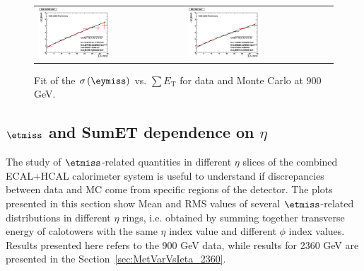 \begin{figure}[h!]
 \centering
 \begin{tabular}{ll}
  \includegraphics[width=0.5\textwidth]{plots_DataVsMC_MB_900GeV/final_metysigma_sumet_DATA_900.eps} &
  \includegraphics[width=0.5\textwidth]{plots_DataVsMC_MB_900GeV/final_metysigma_sumet_MC_900.eps} \\
 \end{tabular}
 \caption{\small Fit of the $\sigma\left(\eymiss\right)$ vs. $\sum E_\text{T}$ for data and Monte Carlo at $900$ GeV.\label{fig:MEySigma_vs_SumET_900_fit}}
\end{figure}


\clearpage

\subsection{$\etmiss$ and SumET dependence on $\eta$} \label{sec:MetVarVsIeta_900}

The study of $\etmiss$-related quantities in different $\eta$
slices of the combined ECAL+HCAL calorimeter system 
is useful to understand if discrepancies between data and MC 
come from specific regions of the detector.
The plots presented in this section show Mean and RMS values 
of several $\etmiss$-related distributions in different 
$\eta$ rings, i.e. obtained by summing together 
transverse energy of calotowers with the same 
$\eta$ index value and different $\phi$ index values.
Results presented here refers to the 900 GeV data, while results for 2360 GeV
are presented in the Section~\ref{sec:MetVarVsIeta_2360}.

